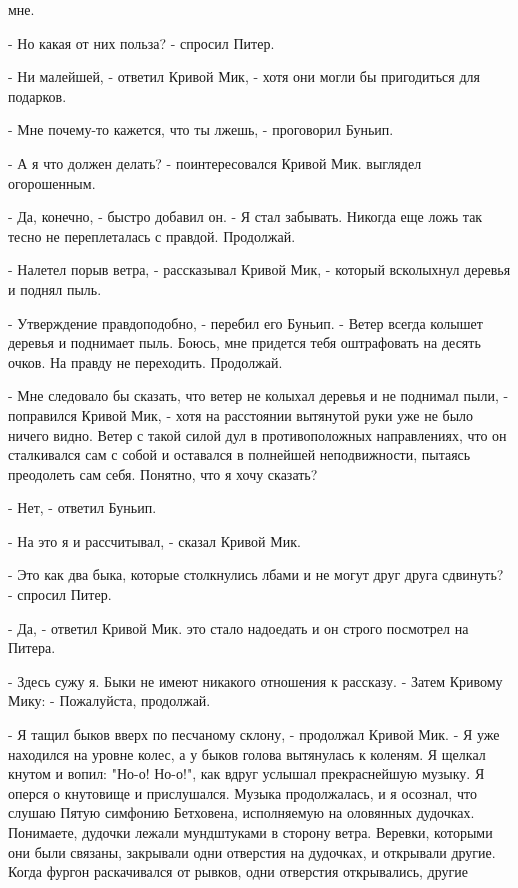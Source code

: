 мне.
\par- Но какая от них польза? - спросил Питер.
\par- Ни малейшей, - ответил Кривой Мик, - хотя они могли бы 
пригодиться для подарков.
\par- Мне почему-то кажется, что ты лжешь, - проговорил Буньип.
\par- А я что должен делать? - поинтересовался Кривой Мик.
 выглядел огорошенным.
\par- Да, конечно, - быстро добавил он. - Я стал забывать. Никогда еще 
ложь так тесно не переплеталась с правдой. Продолжай.
\par- Налетел порыв ветра, - рассказывал Кривой Мик, - который 
всколыхнул деревья и поднял пыль.
\par- Утверждение правдоподобно, - перебил его Буньип. - Ветер всегда 
колышет деревья и поднимает пыль. Боюсь, мне придется тебя оштрафовать 
на десять очков. На правду не переходить. Продолжай.
\par- Мне следовало бы сказать, что ветер не колыхал деревья и не 
поднимал пыли, - поправился Кривой Мик, - хотя на расстоянии вытянутой 
руки уже не было ничего видно. Ветер с такой силой дул в 
противоположных направлениях, что он сталкивался сам с собой и 
оставался в полнейшей неподвижности, пытаясь преодолеть сам себя. 
Понятно, что я хочу сказать?
\par- Нет, - ответил Буньип.
\par- На это я и рассчитывал, - сказал Кривой Мик.
\par- Это как два быка, которые столкнулись лбами и не могут друг 
друга сдвинуть? - спросил Питер.
\par- Да, - ответил Кривой Мик.
 это стало надоедать и он строго посмотрел на Питера.
\par- Здесь сужу я. Быки не имеют никакого отношения к рассказу. - 
Затем Кривому Мику: - Пожалуйста, продолжай.
\par- Я тащил быков вверх по песчаному склону, - продолжал Кривой Мик. 
- Я уже находился на уровне колес, а у быков голова вытянулась к 
коленям. Я щелкал кнутом и вопил: "Но-о! Но-о!", как вдруг услышал 
прекраснейшую музыку. Я оперся о кнутовище и прислушался. Музыка 
продолжалась, и я осознал, что слушаю Пятую симфонию Бетховена, 
исполняемую на оловянных дудочках. Понимаете, дудочки лежали 
мундштуками в сторону ветра. Веревки, которыми они были связаны, 
закрывали одни отверстия на дудочках, и открывали другие. Когда фургон 
раскачивался от рывков, одни отверстия открывались, другие 
